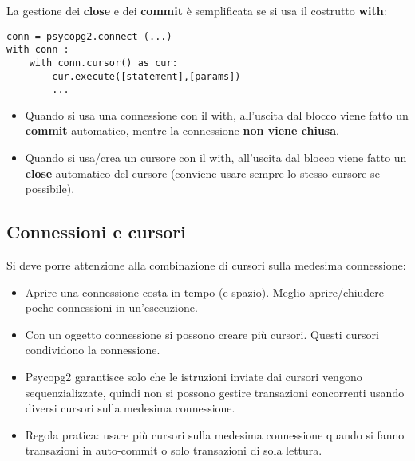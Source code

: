 \documentclass[a4paper, 10pt, titlepage]{article}
\begin{document}
	La gestione dei \textbf{close} e dei \textbf{commit} è semplificata se si usa il costrutto \textbf{with}:
	\begin{lstlisting}[frame=tb]
conn = psycopg2.connect (...)
with conn :
	with conn.cursor() as cur:
		cur.execute([statement],[params])
		...
	\end{lstlisting}
	\begin{itemize}
	\item Quando si usa una connessione con il with, all’uscita dal blocco viene fatto un \textbf{commit} automatico, mentre la connessione \textbf{non viene chiusa}.
	\item Quando si usa/crea un cursore con il with, all’uscita dal blocco viene fatto un \textbf{close} automatico del cursore (conviene usare sempre lo stesso cursore se possibile).
	\end{itemize}
	\subsection{Connessioni e cursori}
	Si deve porre attenzione alla combinazione di cursori sulla medesima connessione:
	\begin{itemize}
	\item Aprire una connessione costa in tempo (e spazio). Meglio
aprire/chiudere poche connessioni in un’esecuzione.
	\item Con un oggetto connessione si possono creare più cursori. Questi cursori condividono la connessione.
	\item Psycopg2 garantisce solo che le istruzioni inviate dai cursori vengono sequenzializzate, quindi non si possono gestire transazioni concorrenti usando diversi cursori sulla medesima connessione.
	\item Regola pratica: usare più cursori sulla medesima connessione quando si fanno transazioni in auto-commit o solo transazioni di sola lettura.
	\end{itemize}
	
\end{document}
